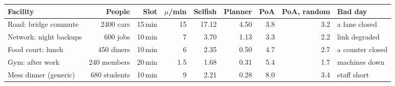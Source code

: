 \begin{tabular}{@{}lrrrrrrrl@{}}\toprule
Facility & People & Slot & $\mu$/min & Selfish & Planner & PoA & PoA, random & Bad day\\\midrule
Road: bridge commute & 2400 cars & 15\,min & 15 & 17.12 & 4.50 & 3.8 & 3.2 & a lane closed\\
Network: night backups & 600 jobs & 10\,min & 7 & 3.70 & 1.13 & 3.3 & 2.2 & link degraded\\
Food court: lunch & 450 diners & 10\,min & 6 & 2.35 & 0.50 & 4.7 & 2.7 & a counter closed\\
Gym: after work & 240 members & 20\,min & 1.5 & 1.68 & 0.31 & 5.4 & 1.7 & machines down\\
Mess dinner (generic) & 680 students & 10\,min & 9 & 2.21 & 0.28 & 8.0 & 3.4 & staff short\\
\bottomrule
\end{tabular}
